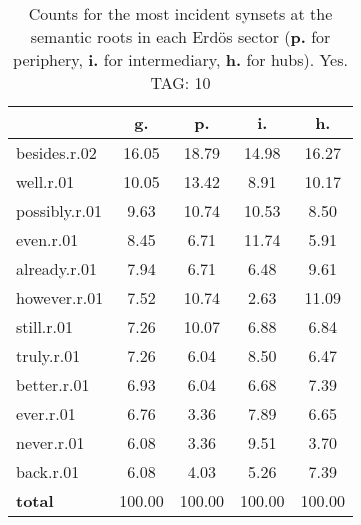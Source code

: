 \begin{table}[h!]
\begin{center}
\begin{tabular}{| l | c | c | c | c |}\hline
 & g. & p. & i. & h. \\\hline
besides.r.02 & 16.05  & 18.79  & 14.98  & 16.27 \\\hline
well.r.01 & 10.05  & 13.42  & 8.91  & 10.17 \\\hline
possibly.r.01 & 9.63  & 10.74  & 10.53  & 8.50 \\\hline
even.r.01 & 8.45  & 6.71  & 11.74  & 5.91 \\\hline
already.r.01 & 7.94  & 6.71  & 6.48  & 9.61 \\\hline
however.r.01 & 7.52  & 10.74  & 2.63  & 11.09 \\\hline
still.r.01 & 7.26  & 10.07  & 6.88  & 6.84 \\\hline
truly.r.01 & 7.26  & 6.04  & 8.50  & 6.47 \\\hline
better.r.01 & 6.93  & 6.04  & 6.68  & 7.39 \\\hline
ever.r.01 & 6.76  & 3.36  & 7.89  & 6.65 \\\hline
never.r.01 & 6.08  & 3.36  & 9.51  & 3.70 \\\hline
back.r.01 & 6.08  & 4.03  & 5.26  & 7.39 \\\hline
{{\bf total}} & 100.00  & 100.00  & 100.00  & 100.00 \\\hline
\end{tabular}
\caption{Counts for the most incident synsets at the semantic roots in each Erd\"os sector ({\bf p.} for periphery, {\bf i.} for intermediary, {\bf h.} for hubs). Yes. TAG: 10}
\end{center}
\end{table}